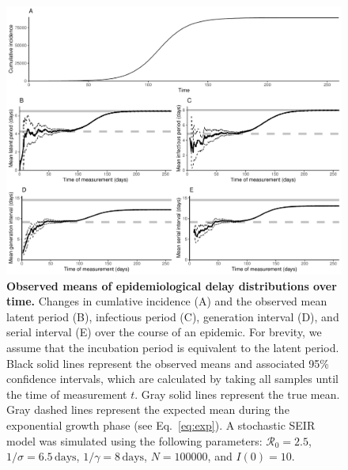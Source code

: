 \documentclass[12pt]{article}
\newcommand{\eref}[1]{Eq.~\ref{eq:#1}}
\begin{document}
\begin{figure}[!th]
\includegraphics[width=\textwidth]{figure_seir.pdf}
\caption{
\textbf{Observed means of epidemiological delay distributions over time.}
Changes in cumlative incidence (A) and the observed mean latent period (B), infectious period (C), generation interval (D), and serial interval (E) over the course of an epidemic.
For brevity, we assume that the incubation period is equivalent to the latent period.
Black solid lines represent the observed means and associated 95\% confidence intervals, which are calculated by taking all samples until the time of measurement $t$.
Gray solid lines represent the true mean.
Gray dashed lines represent the expected mean during the exponential growth phase (see \eref{exp}).
A stochastic SEIR model was simulated using the following parameters: $\mathcal R_0 = 2.5$, $1/\sigma = 6.5\,\textrm{days}$, $1/\gamma = 8\,\textrm{days}$, $N=100000$, and $I(0)=10$.
}
\label{fig:seir}
\end{figure}
\end{document}
